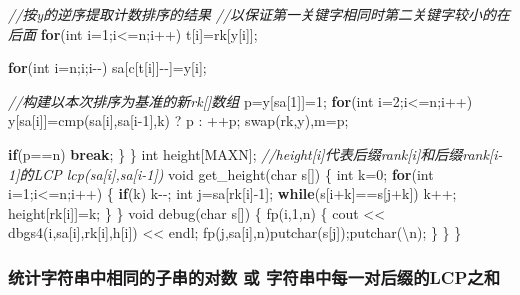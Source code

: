 \documentclass[
]{article}
\newenvironment{Shaded}{}{}
\newcommand{\CharTok}[1]{\textcolor[rgb]{0.25,0.44,0.63}{#1}}
\newcommand{\CommentTok}[1]{\textcolor[rgb]{0.38,0.63,0.69}{\textit{#1}}}
\newcommand{\ControlFlowTok}[1]{\textcolor[rgb]{0.00,0.44,0.13}{\textbf{#1}}}
\newcommand{\DataTypeTok}[1]{\textcolor[rgb]{0.56,0.13,0.00}{#1}}
\newcommand{\DecValTok}[1]{\textcolor[rgb]{0.25,0.63,0.44}{#1}}
\newcommand{\NormalTok}[1]{#1}
\newcommand{\SpecialCharTok}[1]{\textcolor[rgb]{0.25,0.44,0.63}{#1}}
\begin{document}
\begin{Shaded}
\begin{Highlighting}[]
            \CommentTok{//按y的逆序提取计数排序的结果}
            \CommentTok{//以保证第一关键字相同时第二关键字较小的在后面}
            \ControlFlowTok{for}\NormalTok{(}\DataTypeTok{int}\NormalTok{ i=}\DecValTok{1}\NormalTok{;i\textless{}=n;i++) t[i]=rk[y[i]];}
          
          
          
            \ControlFlowTok{for}\NormalTok{(}\DataTypeTok{int}\NormalTok{ i=n;i;i{-}{-}) sa[c[t[i]]{-}{-}]=y[i];}

            \CommentTok{//构建以本次排序为基准的新rk[]数组}
\NormalTok{            p=y[sa[}\DecValTok{1}\NormalTok{]]=}\DecValTok{1}\NormalTok{;}
            \ControlFlowTok{for}\NormalTok{(}\DataTypeTok{int}\NormalTok{ i=}\DecValTok{2}\NormalTok{;i\textless{}=n;i++)}
\NormalTok{                y[sa[i]]=cmp(sa[i],sa[i{-}}\DecValTok{1}\NormalTok{],k) ? p : ++p;}
\NormalTok{            swap(rk,y),m=p;}

            \ControlFlowTok{if}\NormalTok{(p==n) }\ControlFlowTok{break}\NormalTok{;}
\NormalTok{        \}}
\NormalTok{    \}}
    \DataTypeTok{int}\NormalTok{ height[MAXN];}
    \CommentTok{//height[i]代表后缀rank[i]和后缀rank[i{-}1]的LCP lcp(sa[i],sa[i{-}1])}
    \DataTypeTok{void}\NormalTok{ get\_height(}\DataTypeTok{char}\NormalTok{ s[])}
\NormalTok{    \{}
        \DataTypeTok{int}\NormalTok{ k=}\DecValTok{0}\NormalTok{;}
        \ControlFlowTok{for}\NormalTok{(}\DataTypeTok{int}\NormalTok{ i=}\DecValTok{1}\NormalTok{;i\textless{}=n;i++)}
\NormalTok{        \{}
            \ControlFlowTok{if}\NormalTok{(k) k{-}{-};}
            \DataTypeTok{int}\NormalTok{ j=sa[rk[i]{-}}\DecValTok{1}\NormalTok{];}
            \ControlFlowTok{while}\NormalTok{(s[i+k]==s[j+k]) k++;}
\NormalTok{            height[rk[i]]=k;}
\NormalTok{        \}}
\NormalTok{    \}}
    \DataTypeTok{void}\NormalTok{ debug(}\DataTypeTok{char}\NormalTok{ s[])}
\NormalTok{    \{}
\NormalTok{        fp(i,}\DecValTok{1}\NormalTok{,n)}
\NormalTok{        \{}
\NormalTok{            cout \textless{}\textless{} dbgs4(i,sa[i],rk[i],h[i]) \textless{}\textless{} endl;}
\NormalTok{            fp(j,sa[i],n)putchar(s[j]);putchar(}\CharTok{\textquotesingle{}}\SpecialCharTok{\textbackslash{}n}\CharTok{\textquotesingle{}}\NormalTok{);}
\NormalTok{        \}}
\NormalTok{    \}}
\NormalTok{\}}
\end{Highlighting}
\end{Shaded}

\hypertarget{ux7edfux8ba1ux5b57ux7b26ux4e32ux4e2dux76f8ux540cux7684ux5b50ux4e32ux7684ux5bf9ux6570-ux6216-ux5b57ux7b26ux4e32ux4e2dux6bcfux4e00ux5bf9ux540eux7f00ux7684lcpux4e4bux548c}{%
\subsubsection{统计字符串中相同的子串的对数 或
字符串中每一对后缀的LCP之和}\label{ux7edfux8ba1ux5b57ux7b26ux4e32ux4e2dux76f8ux540cux7684ux5b50ux4e32ux7684ux5bf9ux6570-ux6216-ux5b57ux7b26ux4e32ux4e2dux6bcfux4e00ux5bf9ux540eux7f00ux7684lcpux4e4bux548c}}
\end{document}
